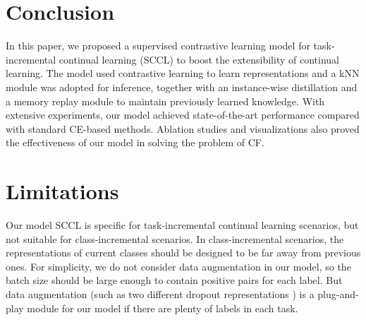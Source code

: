\section{Conclusion}
In this paper, we proposed a supervised contrastive learning model for task-incremental continual learning (SCCL) to boost the extensibility of continual learning. The model used contrastive learning to learn representations and a kNN module was adopted for inference, together with an instance-wise distillation and a memory replay module to maintain previously learned knowledge.   With extensive experiments, our model achieved state-of-the-art performance compared with standard CE-based methods. Ablation studies and visualizations also proved the effectiveness of our model in solving the problem of CF. 

\clearpage
\section{Limitations}
Our model SCCL is specific for task-incremental continual learning scenarios, but not suitable for class-incremental scenarios. In class-incremental scenarios, the representations of current classes should be designed to be far away from previous ones. For simplicity,  we do not consider data augmentation in our model, so the batch size should be large enough to contain positive pairs for each label. But data augmentation (such as two different dropout representations \cite{gao-etal-2021-simcse}) is a plug-and-play module for our model if there are plenty of labels in each task.